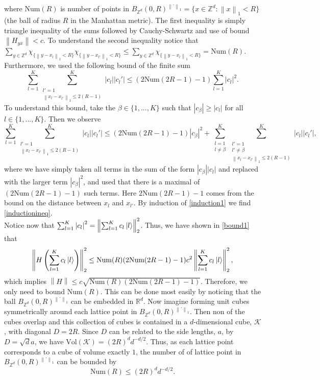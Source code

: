 \documentclass[a4paper,11pt]{article}
\newcommand{\norm}[1]{\left\lVert #1 \right\rVert}
\newcommand{\abs}[1]{\left\lvert #1 \right\rvert}
\newcommand{\R}{\mathbb{R}}
\newcommand{\Z}{\mathbb{Z}}
\numberwithin{equation}{section}
\begin{document}
 	 where $ \text{Num}(R) $ is number of points in $ B_{\Z^d}(0,R)^{\norm{\cdot}_1}=\{x\in\Z^d : \norm{x}_1<R \} $ (the ball of radius $ R $ in the Manhattan metric). The first inequality is simply triangle inequality of the sums followed by Cauchy-Schwartz and use of bound $ \norm{H_{yx}}<c $. To understand the second inequality notice that $ \sum_{y\in\Z^d}\chi_{\{\norm{y-x_l}_1<R\}}\chi_{\{\norm{y-x_{l'}}_1<R\}}\leq\sum_{y\in\Z^d}\chi_{\{\norm{y-x_l}_1<R\}}=\text{Num}(R) $. Furthermore, we used the following bound of the finite sum \begin{equation}
 	 \sum_{l=1}^{K}\sum_{\substack{l'=1\\\norm{x_l-x_{l'}}_1\leq2(R-1)}}^{K}\abs{c_l}\abs{c_l'}\leq (2\text{Num}(2R-1)-1)\sum_{l=1}^{K}\abs{c_l}^2. \label{inductionineq}
 	 \end{equation}
 	 To understand this bound, take the $ \beta\in \{1,...,K\} $ such that $ |c_\beta|\geq|c_l| $ for all $ l\in \{1,...,K\} $. Then we observe\begin{equation}
 	  \sum_{l=1}^{K}\sum_{\substack{l'=1\\\norm{x_l-x_{l'}}_1\leq2(R-1)}}^{K}\abs{c_l}\abs{c_l'}\leq (2\text{Num}(2R-1)-1)\abs{c_\beta}^2+ \sum_{\substack{l=1\\ l\neq\beta}}^{K}\sum_{\substack{l'=1\\l'\neq\beta\\\norm{x_l-x_{l'}}_1\leq2(R-1)}}^{K}\abs{c_l}\abs{c_l'},\label{induction1}
 	 \end{equation}
 	 where we have simply taken all terms in the sum of the form $ |c_\beta||c_l| $ and replaced with the larger term $ |c_\beta|^2 $, and used that there is a maximal of $ (2\text{Num}(2R-1)-1) $ such terms. Here $2\text{Num}(2R-1)-1$ comes from the bound on the distance between $ x_l $ and $ x_{l'} $. By induction of \eqref{induction1} we find \eqref{inductionineq}.\\
 	 Notice now that $ \sum_{l=1}^{K}\abs{c_l}^2=\norm{\sum_{l=1}^{K}c_l\ket{l}}_2^2 $. Thus, we have shown in \eqref{bound1} that \begin{equation}
 	 \norm{H\left(\sum_{l=1}^{K}c_l\ket{l}\right)}_2^2\leq \text{Num}(R)(2\text{Num}(2R-1)-1)c^2\norm{\sum_{l=1}^{K}c_l\ket{l}}_2^2,
 	 \end{equation} 
 	 which implies $ \norm{H}\leq c\sqrt{\text{Num}(R)(2\text{Num}(2R-1)-1)} $. Therefore, we only need to bound $ \text{Num}(R) $. This can be done most easily by noticing that the ball $ B_{\Z^d}(0,R)^{\norm{\cdot}_1} $ can be embedded in $ \R^d $. Now imagine forming unit cubes symmetrically around each lattice point in $ B_{\Z^d}(0,R)^{\norm{\cdot}_1} $. Then non of the cubes overlap and this collection of cubes is contained in a $ d $-dimensional cube, $ \mathcal{K} $, with diagonal $ D=2R $. Since $ D $ can be related to the side lengths, $ a $, by $ D=\sqrt{d}a $, we have $ \text{Vol}(\mathcal{K})=(2R)^d d^{-d/2} $. Thus, as each lattice point corresponds to a cube of volume exactly $ 1 $, the number of of lattice point in $ B_{\Z^d}(0,R)^{\norm{\cdot}_1} $ can be bounded by\begin{equation}
 	 \text{Num}(R)\leq(2R)^dd^{-d/2}.
 	 \end{equation}
\end{document}
